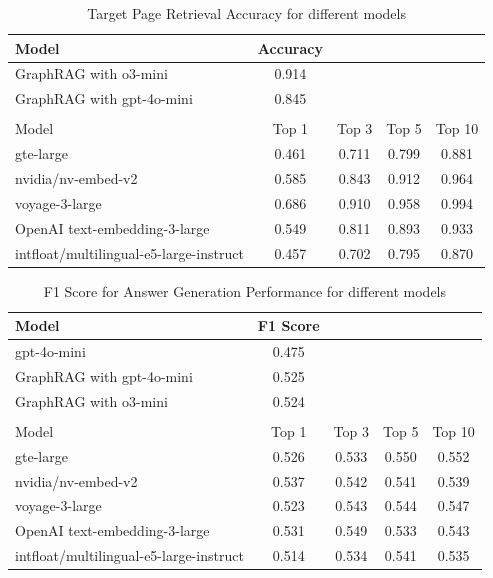 \documentclass[runningheads]{llncs}
\begin{document}
\begin{table}[h]
    \caption{Target Page Retrieval Accuracy for different models}
    \centering
    \begin{tabular}{lcccc}
        \hline
        Model & Accuracy\\
        \hline
        GraphRAG with o3-mini & 0.914 \\
        GraphRAG with gpt-4o-mini & 0.845 \\
        \hline
        \\
        \hline
        Model &  Top 1 & Top 3 & Top 5 & Top 10 \\ \hline
        gte-large & 0.461 & 0.711 & 0.799 & 0.881 \\ 
        nvidia/nv-embed-v2 & 0.585 & 0.843 & 0.912 & 0.964 \\ 
        voyage-3-large & 0.686 & 0.910 & 0.958 & 0.994\\
        OpenAI text-embedding-3-large & 0.549 & 0.811 & 0.893 & 0.933\\
        intfloat/multilingual-e5-large-instruct & 0.457 & 0.702 & 0.795 & 0.870\\
        \hline
    \end{tabular}
    \label{tab:embedding_result}
\end{table}


\begin{table}[ht]
    \caption{F1 Score for Answer Generation Performance for different models}
    \centering
    \begin{tabular}{lcccc}
        \hline
        Model & F1 Score\\
        \hline
        gpt-4o-mini & 0.475 \\ 
        GraphRAG with gpt-4o-mini & 0.525 \\
        GraphRAG with o3-mini & 0.524 \\
        \hline
        \\
        \hline
        Model & Top 1 & Top 3 & Top 5 & Top 10 \\ 
        \hline 
        gte-large & 0.526 & 0.533 & 0.550 & 0.552 \\ 
        nvidia/nv-embed-v2 & 0.537 & 0.542 & 0.541 & 0.539 \\ 
        voyage-3-large & 0.523 & 0.543 & 0.544 & 0.547\\
        OpenAI text-embedding-3-large & 0.531 & 0.549 & 0.533 & 0.543\\
        intfloat/multilingual-e5-large-instruct & 0.514 & 0.534 & 0.541 & 0.535\\
        \hline
    \end{tabular}
    \label{tab:answer_f1}
\end{table}
\end{document}

